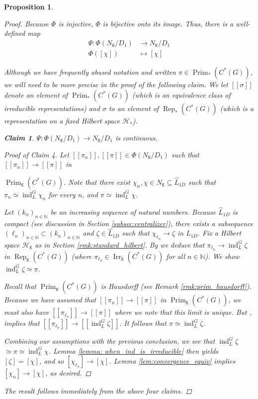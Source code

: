 \documentclass[11pt, twoside]{amsart}
\newcommand{\te}[1]{\operatorname{#1}}
\newcommand{\nn}{\mathbb{N}}
\newcommand{\Prim}{\operatorname{Prim}}
\newcommand{\Rep}{\operatorname{Rep}}
\newcommand{\sse}{\subseteq}
\newcommand{\mc}{\mathcal}
\newcommand{\mt}{\mathtt}
\newcommand{\wh}{\widehat}
\newtheorem{prop}[thm]{Proposition}
\newtheorem{claim}{Claim}
\theoremstyle{definition}
\newcommand{\B}{\mathbb}
\newcommand{\N}{\B{N}}
\begin{document}
\begin{prop}
\begin{proof}
Because $\Phi$ is injective, $\Phi$ is bijective onto its image. Thus, there is a well-defined map 
\begin{align*}
\Psi:\Phi(N_{\mt K}/D_1)&\rightarrow N_{\mt K}\slash D_1\\
\Phi([\chi])&\mapsto[\chi]
\end{align*}

Although we have frequently abused notation and written $\pi\in\te{Prim}_*(C^*(G))$, we will need to be more precise in the proof of the following claim. We let $[[\sigma]]$ denote an element of $\te{Prim}_*(C^*(G))$ (which is an {\em equivalence class} of irreducible representations) and $\sigma$ to an element of $\Rep_*(C^*(G))$ (which is a representation on a fixed Hilbert space $\mc{H}_*$).


\begin{claim}
   $\Psi:\Phi(N_{\mt{K}}/D_1)\to N_{\mt{K}}/D_1$ is continuous.
\end{claim}
\begin{proof}[Proof of Claim 4]
Let $[[\pi_n]],[[\pi]] \in \Phi(N_{\mt{K}}/D_1)$ such that $[[\pi_n]]\to [[\pi]]$ in \par \noindent$\Prim_{\mt{K}}(C^*(G))$. Note that there exist $\chi_n,\chi\in N_{\mt{K}}\sse\wh{L}_{1D}$ such that $\pi_n\simeq \te{ind}_{L}^G \chi_n$ for every $n$, and $\pi\simeq \te{ind}_L^G \chi$. \par
Let $(k_n)_{n\in \N}$ be an increasing sequence of natural numbers. Because $\wh{L}_{1D}$ is compact (see discussion in Section \ref{subsec:centralizer}), there exists a subsequence $(\ell_n)_{n\in \N}\subset (k_n)_{n\in \N}$ and $\zeta\in \wh{L}_{1D}$ such that $\chi_{\ell_n}\to \zeta$ in $\wh{L}_{1D}$. Fix a Hilbert space $\mc{H}_{\mt K}$ as in Section \ref{rmk:standard_hilbert}. By \cite[Lemma 4.22]{CW24} we deduce that $\pi_{\ell_n}\to \te{ind}_L^G \zeta$ in $\Rep_{\mt{K}}(C^*(G))$ (where $\pi_{\ell_n}\in\te{Irr}_{\mt{K}}(C^*(G))$ for all $n\in\nn$). We show $\te{ind}_L^G\zeta\simeq\pi$.

Recall that $\te{Prim}_{\mt K}(C^*(G))$ is Hausdorff (see Remark \ref{rmk:prim_hausdorff}). Because we have assumed that $[[\pi_n]]\to [[\pi]]$ in $\Prim_{\mt{K}}(C^*(G))$, we must also have $[[\pi_{\ell_n}]]\rightarrow[[\pi]]$ where we note that this limit is unique. %
 But \cite[Thm. 4.7]{CW24}, implies that $[[\pi_{\ell_n}]]\to [[\te{ind}_L^G \zeta]].$ It follows that $\pi\simeq \te{ind}_L^G\zeta$.

Combining our assumptions with the previous conclusion, we see that $\te{ind}_L^G\zeta$ $\simeq \pi\simeq \te{ind}_L^G\chi$. Lemma \ref{lemma: when_ind_is_irreducible} then yields $[\zeta]=[\chi]$, and so $[\chi_{\ell_n}]\to [\chi]$. Lemma \ref{lem:convergence_equiv} implies $[\chi_n]\to [\chi]$, as desired. \qedhere

\end{proof}
The result follows immediately from the above four claims.

\end{proof}
\end{prop}
\end{document}
